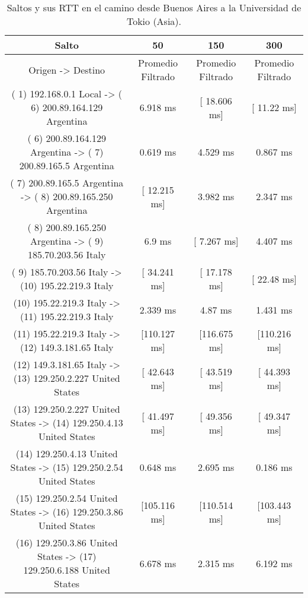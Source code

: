 \begin{table}[]
\centering
\caption{Saltos y sus RTT en el camino desde Buenos Aires a la Universidad de Tokio (Asia).}
\begin{tabular}{ | c | c | c | c | }
	\hline 
Salto	& 50	& 150	& 300 \\ \hline
Origen                ->               Destino               	               & Promedio Filtrado &  Promedio Filtrado&	Promedio Filtrado \\ \hline
( 1) 192.168.0.1     Local           -> ( 6) 200.89.164.129  Argentina    &  	     6.918 ms   &	  [ 18.606 ms]  	 & [  11.22 ms]   \\ \hline
( 6) 200.89.164.129  Argentina       -> ( 7) 200.89.165.5    Argentina    &  	     0.619 ms   &	     4.529 ms   	 &    0.867 ms    \\ \hline
( 7) 200.89.165.5    Argentina       -> ( 8) 200.89.165.250  Argentina    &  	  [ 12.215 ms]  &	     3.982 ms   	 &    2.347 ms    \\ \hline
( 8) 200.89.165.250  Argentina       -> ( 9) 185.70.203.56   Italy        &  	       6.9 ms   &	  [  7.267 ms]  	 &    4.407 ms    \\ \hline
( 9) 185.70.203.56   Italy           -> (10) 195.22.219.3    Italy        &  	  [ 34.241 ms]  &	  [ 17.178 ms]  	 & [  22.48 ms]   \\ \hline
(10) 195.22.219.3    Italy           -> (11) 195.22.219.3    Italy        &  	     2.339 ms   &	      4.87 ms   	 &    1.431 ms    \\ \hline
(11) 195.22.219.3    Italy           -> (12) 149.3.181.65    Italy        &  	  [110.127 ms]  &	  [116.675 ms]  	 & [110.216 ms]   \\ \hline
(12) 149.3.181.65    Italy           -> (13) 129.250.2.227   United States&  	  [ 42.643 ms]  &	  [ 43.519 ms]  	 & [ 44.393 ms]   \\ \hline
(13) 129.250.2.227   United States   -> (14) 129.250.4.13    United States&  	  [ 41.497 ms]  &	  [ 49.356 ms]  	 & [ 49.347 ms]   \\ \hline
(14) 129.250.4.13    United States   -> (15) 129.250.2.54    United States&  	     0.648 ms   &	     2.695 ms   	 &    0.186 ms    \\ \hline
(15) 129.250.2.54    United States   -> (16) 129.250.3.86    United States&  	  [105.116 ms]  &	  [110.514 ms]  	 & [103.443 ms]   \\ \hline
(16) 129.250.3.86    United States   -> (17) 129.250.6.188   United States&  	     6.678 ms   &	     2.315 ms   	 &    6.192 ms    \\ \hline

\end{tabular}
\end{table}

